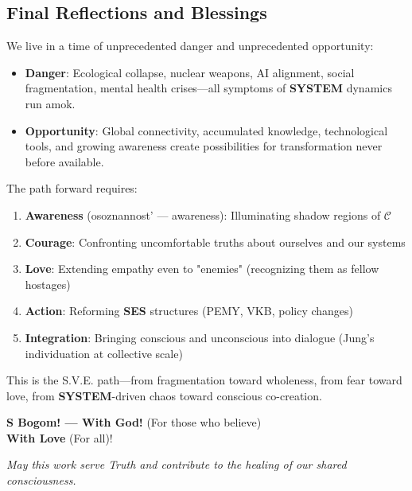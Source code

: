 \documentclass[11pt,a4paper]{article}
\newcommand{\SYSTEM}{\textbf{SYSTEM}}
\newcommand{\SES}{\textbf{SES}}
\newcommand{\CC}{$\mathcal{C}$}
\theoremstyle{definition}
\theoremstyle{remark}
\begin{document}
\subsection{Final Reflections and Blessings}

We live in a time of unprecedented danger and unprecedented opportunity:
\begin{itemize}
\item \textbf{Danger}: Ecological collapse, nuclear weapons, AI alignment, social fragmentation, mental health crises—all symptoms of \SYSTEM{} dynamics run amok.
\item \textbf{Opportunity}: Global connectivity, accumulated knowledge, technological tools, and growing awareness create possibilities for transformation never before available.
\end{itemize}

The path forward requires:
\begin{enumerate}
\item \textbf{Awareness} (osoznannost' — awareness): Illuminating shadow regions of \CC{}
\item \textbf{Courage}: Confronting uncomfortable truths about ourselves and our systems
\item \textbf{Love}: Extending empathy even to "enemies" (recognizing them as fellow hostages)
\item \textbf{Action}: Reforming \SES{} structures (PEMY, VKB, policy changes)
\item \textbf{Integration}: Bringing conscious and unconscious into dialogue (Jung's individuation at collective scale)
\end{enumerate}

This is the S.V.E. path—from fragmentation toward wholeness, from fear toward love, from \SYSTEM{}-driven chaos toward conscious co-creation.

\vspace{1em}

\begin{center}

\textbf{S Bogom! — With God!} (For those who believe) \\

\textbf{With Love} (For all)!
\end{center}

\vspace{1em}

\textit{May this work serve Truth and contribute to the healing of our shared consciousness.}
\end{document}
